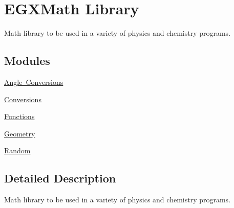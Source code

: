 \hypertarget{group___e_g_x_math}{}\section{E\+G\+X\+Math Library}
\label{group___e_g_x_math}


Math library to be used in a variety of physics and chemistry programs.  


\subsection*{Modules}
\begin{DoxyCompactItemize}
\item 
\mbox{\hyperlink{group___e_g_x_math-_angle_conversions}{Angle Conversions}}
\item 
\mbox{\hyperlink{group___e_g_x_math-_conversions}{Conversions}}
\item 
\mbox{\hyperlink{group___e_g_x_math-_functions}{Functions}}
\item 
\mbox{\hyperlink{group___e_g_x_math-_geometry}{Geometry}}
\item 
\mbox{\hyperlink{group___e_g_x_math-_random}{Random}}
\end{DoxyCompactItemize}


\subsection{Detailed Description}
Math library to be used in a variety of physics and chemistry programs. 

